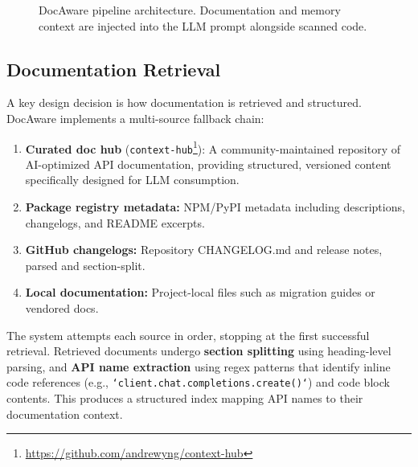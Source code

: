 \documentclass[sigconf,nonacm]{acmart}
\begin{document}
\begin{figure}[h]
\centering
{}
\caption{DocAware pipeline architecture. Documentation and memory context are injected into the LLM prompt alongside scanned code.}
\label{fig:architecture}
\end{figure}

\subsection{Documentation Retrieval}
\label{sec:doc-retrieval}

A key design decision is how documentation is retrieved and structured. DocAware implements a multi-source fallback chain:

\begin{enumerate}
    \item \textbf{Curated doc hub} (\texttt{context-hub}\footnote{\url{https://github.com/andrewyng/context-hub}}): A community-maintained repository of AI-optimized API documentation, providing structured, versioned content specifically designed for LLM consumption.
    \item \textbf{Package registry metadata:} NPM/PyPI metadata including descriptions, changelogs, and README excerpts.
    \item \textbf{GitHub changelogs:} Repository CHANGELOG.md and release notes, parsed and section-split.
    \item \textbf{Local documentation:} Project-local files such as migration guides or vendored docs.
\end{enumerate}

The system attempts each source in order, stopping at the first successful retrieval. Retrieved documents undergo \textbf{section splitting} using heading-level parsing, and \textbf{API name extraction} using regex patterns that identify inline code references (e.g., \texttt{`client.chat.completions.create()`}) and code block contents. This produces a structured index mapping API names to their documentation context.
\end{document}
